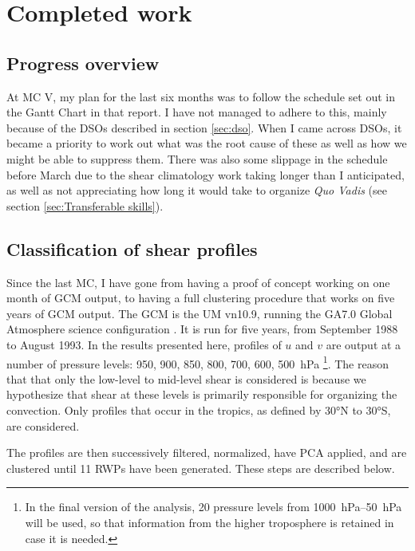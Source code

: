 \documentclass[11pt,a4paper]{article}
\begin{document}
\section{Completed work}
\label{sec:Completed work}

\subsection{Progress overview}
\label{sec:Progress overview}

At MC V, my plan for the last six months was to follow the schedule set out in the Gantt Chart in that report. I have not managed to adhere to this, mainly because of the DSOs described in section \ref{sec:dso}. When I came across DSOs, it became a priority to work out what was the root cause of these as well as how we might be able to suppress them. There was also some slippage in the schedule before March due to the shear climatology work taking longer than I anticipated, as well as not appreciating how long it would take to organize \textit{Quo Vadis} (see section \ref{sec:Transferable skills}).

\subsection{Classification of shear profiles}
\label{sec:Classification of shear profiles}
Since the last MC, I have gone from having a proof of concept working on one month of GCM output, to having a full clustering procedure that works on five years of GCM output. The GCM is the UM vn10.9, running the GA7.0 Global Atmosphere science configuration \parencite{walters2018met}. It is run for five years, from September 1988 to August 1993. In the results presented here, profiles of $u$ and $v$ are output at a number of pressure levels: \SI{950}{}, \SI{900}{}, \SI{850}{}, \SI{800}{}, \SI{700}{}, \SI{600}{}, \SI{500}{hPa} \footnote{In the final version of the analysis, 20 pressure levels from \SIrange{1000}{50}{hPa} will be used, so that information from the higher troposphere is retained in case it is needed.}. The reason that that only the low-level to mid-level shear is considered is because we hypothesize that shear at these levels is primarily responsible for organizing the convection. Only profiles that occur in the tropics, as defined by 30\si{\degree}N to 30\si{\degree}S, are considered.

The profiles are then successively filtered, normalized, have PCA applied, and are clustered until 11 RWPs have been generated. These steps are described below.
\end{document}
